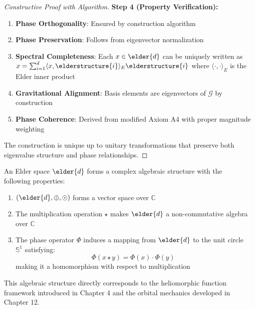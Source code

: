 \begin{proof}[Constructive Proof with Algorithm]
\textbf{Step 4 (Property Verification):}
\begin{enumerate}
    \item \textbf{Phase Orthogonality}: Ensured by construction algorithm
    \item \textbf{Phase Preservation}: Follows from eigenvector normalization
    \item \textbf{Spectral Completeness}: Each $x \in \elder{d}$ can be uniquely written as $x = \sum_{i=1}^{d} \langle x, \elderstructure{i} \rangle_E \elderstructure{i}$ where $\langle \cdot, \cdot \rangle_E$ is the Elder inner product
    \item \textbf{Gravitational Alignment}: Basis elements are eigenvectors of $\mathcal{G}$ by construction
    \item \textbf{Phase Coherence}: Derived from modified Axiom A4 with proper magnitude weighting
\end{enumerate}

The construction is unique up to unitary transformations that preserve both eigenvalue structure and phase relationships.
\end{proof}

\begin{corollary}
\label{cor:algebraic_structure}
An Elder space $\elder{d}$ forms a complex algebraic structure with the following properties:
\begin{enumerate}
    \item $(\elder{d}, \oplus, \odot)$ forms a vector space over $\mathbb{C}$
    \item The multiplication operation $\star$ makes $\elder{d}$ a non-commutative algebra over $\mathbb{C}$
    \item The phase operator $\Phi$ induces a mapping from $\elder{d}$ to the unit circle $\mathbb{S}^1$ satisfying:
    \begin{equation}
        \Phi(x \star y) = \Phi(x) \cdot \Phi(y)
    \end{equation}
    making it a homomorphism with respect to multiplication
\end{enumerate}
This algebraic structure directly corresponds to the heliomorphic function framework introduced in Chapter 4 and the orbital mechanics developed in Chapter 12.
\end{corollary}

